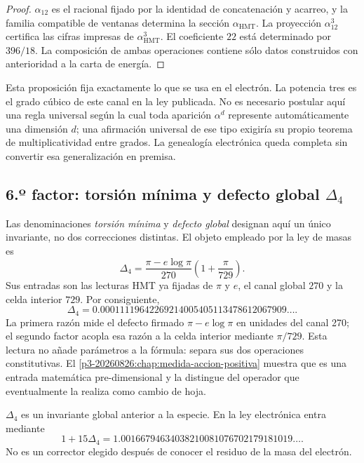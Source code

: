 \begin{proof}
\(\alpha_{12}\) es el racional fijado por la identidad de concatenación y
acarreo, y la familia compatible de ventanas determina la sección
\(\alpha_{\mathrm{HMT}}\). La proyección \(\alpha_{12}^3\) certifica las
cifras impresas de \(\alpha_{\mathrm{HMT}}^3\).
El coeficiente \(22\) está determinado por \(396/18\). La composición de
ambas operaciones contiene sólo datos construidos con anterioridad a la
carta de energía.
\end{proof}

Esta proposición fija exactamente lo que se usa en el electrón. La potencia
tres es el grado cúbico de este canal en la ley publicada. No es necesario
postular aquí una regla universal según la cual toda aparición
\(\alpha^d\) represente automáticamente una dimensión \(d\); una
afirmación universal de ese tipo exigiría su propio teorema de
multiplicatividad entre grados. La genealogía electrónica queda completa
sin convertir esa generalización en premisa.

\subsection{6.º factor: torsión mínima y defecto global \(\Delta_4\)}

Las denominaciones \emph{torsión mínima} y \emph{defecto global}
designan aquí un único invariante, no dos correcciones distintas. El objeto
empleado por la ley de masas es
\begin{equation}
 \label{p12-83-c15-s2:eq:delta4-electron-rev6}
 \boxed{
 \Delta_4
 =
 \frac{\pi-e\log\pi}{270}
 \left(1+\frac{\pi}{729}\right).}
\end{equation}
Sus entradas son las lecturas HMT ya fijadas de \(\pi\) y \(e\), el canal
global \(270\) y la celda interior \(729\). Por consiguiente,
\[
 \Delta_4
 =
 0.00011119642269214005405113478612067909\ldots.
\]
La primera razón mide el defecto firmado
\(\pi-e\log\pi\) en unidades del canal 270; el segundo factor acopla esa
razón a la celda interior mediante \(\pi/729\). Esta lectura no añade
parámetros a la fórmula: separa sus dos operaciones constitutivas.
El \cref{p3-20260826:chap:medida-accion-positiva} muestra que es una entrada matemática
pre-dimensional y la distingue del operador que eventualmente la realiza
como cambio de hoja.

\begin{proposition}
\label{p12-83-c15-s2:prop:delta4-global-electron-rev6}
\(\Delta_4\) es un invariante global anterior a la especie. En la ley
electrónica entra mediante
\[
 1+15\Delta_4
 =
 1.00166794634038210081076702179181019\ldots.
\]
No es un corrector elegido después de conocer el residuo de la masa del
electrón.
\end{proposition}

